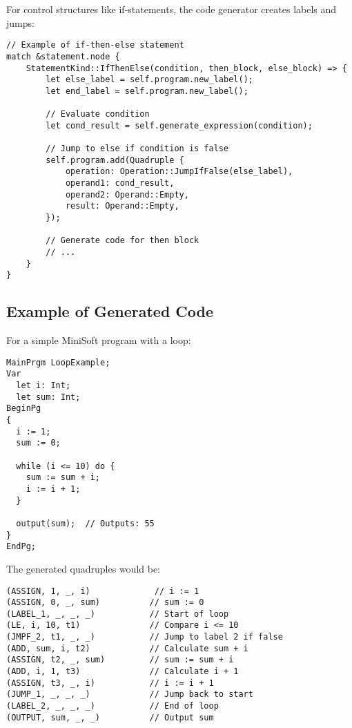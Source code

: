 \documentclass[12pt,a4paper]{article}
\begin{document}
For control structures like if-statements, the code generator creates labels and jumps:

\begin{lstlisting}[caption={If-Statement Code Generation}]
// Example of if-then-else statement
match &statement.node {
    StatementKind::IfThenElse(condition, then_block, else_block) => {
        let else_label = self.program.new_label();
        let end_label = self.program.new_label();
        
        // Evaluate condition
        let cond_result = self.generate_expression(condition);
        
        // Jump to else if condition is false
        self.program.add(Quadruple {
            operation: Operation::JumpIfFalse(else_label),
            operand1: cond_result,
            operand2: Operand::Empty,
            result: Operand::Empty,
        });
        
        // Generate code for then block
        // ...
    }
}
\end{lstlisting}

\subsection{Example of Generated Code}
For a simple MiniSoft program with a loop:

\begin{lstlisting}[caption={Sample MiniSoft Program}]
MainPrgm LoopExample;
Var
  let i: Int;
  let sum: Int;
BeginPg
{
  i := 1;
  sum := 0;
  
  while (i <= 10) do {
    sum := sum + i;
    i := i + 1;
  }
  
  output(sum);  // Outputs: 55
}
EndPg;
\end{lstlisting}

The generated quadruples would be:

\begin{lstlisting}[caption={Generated Quadruples}]
(ASSIGN, 1, _, i)             // i := 1
(ASSIGN, 0, _, sum)          // sum := 0
(LABEL_1, _, _, _)           // Start of loop
(LE, i, 10, t1)              // Compare i <= 10
(JMPF_2, t1, _, _)           // Jump to label 2 if false
(ADD, sum, i, t2)            // Calculate sum + i
(ASSIGN, t2, _, sum)         // sum := sum + i
(ADD, i, 1, t3)              // Calculate i + 1
(ASSIGN, t3, _, i)           // i := i + 1
(JUMP_1, _, _, _)            // Jump back to start
(LABEL_2, _, _, _)           // End of loop
(OUTPUT, sum, _, _)          // Output sum
\end{lstlisting}
\end{document}
